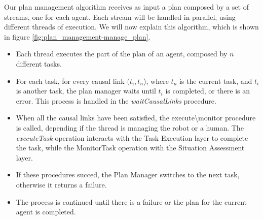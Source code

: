 Our plan management algorithm receives as input a plan composed by a set of streams, one for each agent. Each stream will be handled in parallel, using different threads of execution. We will now explain this algorithm, which is shown in figure \ref{fig:plan_management-manage_plan}.
\begin{itemize}
  \item Each thread executes the part of the plan of an agent, composed by $n$ different tasks.
  \item For each task, for every causal link $(t_i,t_n$), where $t_n$ is the current task, and $t_i$ is another task, the plan manager waits until $t_i$ is completed, or there is an error. This process is handled in the \textit{waitCausalLinks} procedure.
  \item When all the causal links have been satisfied, the execute\textbackslash monitor procedure is called, depending if the thread is managing the robot or a human. The \textit{executeTask} operation interacts with the Task Execution layer to complete the task, while the MonitorTask operation with the Situation Assessment layer.
  \item If these procedures succed, the Plan Manager switches to the next task, otherwise it returns a failure.
  \item The process is continued until there is a failure or the plan for the current agent is completed.
\end{itemize} 

